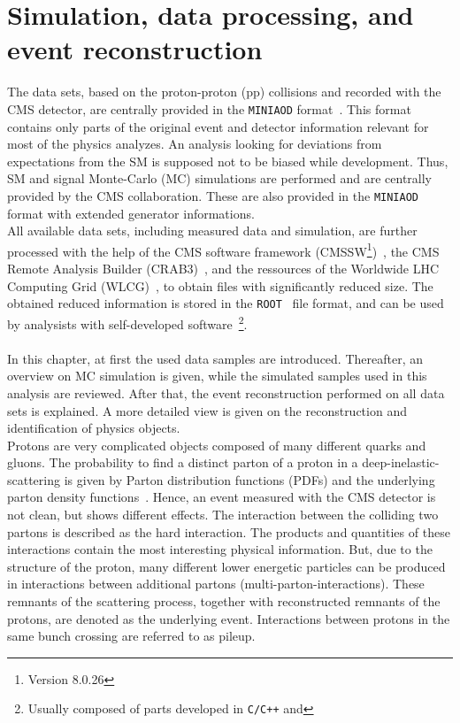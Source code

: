 \chapter{Simulation, data processing, and event reconstruction}\label{chap:reco}
The data sets, based on the proton-proton (pp) collisions and recorded with the CMS detector, are centrally provided in the \texttt{MINIAOD} format~\cite{MiniAOD}. This format contains only parts of the original event and detector information relevant for most of the physics analyzes. An analysis looking for deviations from expectations from the SM is supposed not to be biased while development. Thus, SM and signal Monte-Carlo (MC) simulations are performed and are centrally provided by the CMS collaboration. These are also provided in the \texttt{MINIAOD} format with extended generator informations.\\
All available data sets, including measured data and simulation, are further processed with the help of the CMS software framework (CMSSW\footnote{Version 8.0.26})~\cite{CMSSW}, the CMS Remote Analysis Builder (CRAB3)~\cite{CRAB}, and the ressources of the Worldwide LHC Computing Grid (WLCG)~\cite{Grid}, to obtain files with significantly reduced size. The obtained reduced information is stored in the \texttt{ROOT}~\cite{ROOT} file format, and can be used by analysists with self-developed software~\footnote{Usually composed of parts developed in \texttt{C/C++} and }.\\
\\
In this chapter, at first the used data samples are introduced. Thereafter, an overview on MC simulation is given, while the simulated samples used in this analysis are reviewed. After that, the event reconstruction performed on all data sets is explained. A more detailed view is given on the reconstruction and identification of physics objects.\\
Protons are very complicated objects composed of many different quarks and gluons. The probability to find a distinct parton of a proton in a deep-inelastic-scattering is given by Parton distribution functions (PDFs) and the underlying parton density functions~\cite{PDF}. Hence, an event measured with the CMS detector is not clean, but shows different effects. The interaction between the colliding two partons is described as the hard interaction. The products and quantities of these interactions contain the most interesting physical information. But, due to the structure of the proton, many different lower energetic particles can be produced in interactions between additional partons (multi-parton-interactions). These remnants of the scattering process, together with reconstructed remnants of the protons, are denoted as the underlying event. Interactions between protons in the same bunch crossing are referred to as pileup.

